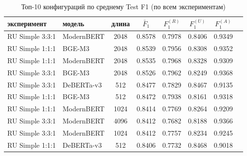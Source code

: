 \begin{table}[H]
\centering
\caption{Топ-10 конфигураций по среднему Test F1 (по всем экспериментам)}
\label{tab:leaderboard_top10}
\small
\setlength{\tabcolsep}{4pt}
\begin{tabular}{llcccccc}
\toprule
эксперимент & модель & длина & $\bar{F}_1$ & $F_1^{(R)}$ & $F_1^{(U)}$ & $F_1^{(A)}$ \\
\midrule
RU Simple 3:3:1 & ModernBERT & 2048 & 0.8578 & 0.7978 & 0.8406 & 0.9349 \\
RU Simple 1:1:1 & BGE-M3     & 2048 & 0.8539 & 0.7956 & 0.8308 & 0.9352 \\
RU Simple 1:1:1 & ModernBERT & 2048 & 0.8535 & 0.7968 & 0.8328 & 0.9309 \\
RU Simple 3:3:1 & BGE-M3     & 2048 & 0.8526 & 0.7962 & 0.8249 & 0.9368 \\
RU Simple 3:3:1 & DeBERTa-v3 & 512  & 0.8477 & 0.7829 & 0.8467 & 0.9135 \\
RU Simple 1:1:1 & BGE-M3     & 512  & 0.8472 & 0.7938 & 0.8161 & 0.9318 \\
RU Simple 1:1:1 & ModernBERT & 1024 & 0.8414 & 0.7769 & 0.8264 & 0.9209 \\
RU Simple 3:3:1 & ModernBERT & 4096 & 0.8412 & 0.7682 & 0.8188 & 0.9366 \\
RU Simple 3:3:1 & ModernBERT & 1024 & 0.8412 & 0.7757 & 0.8234 & 0.9245 \\
RU Simple 1:1:1 & DeBERTa-v3 & 512  & 0.8406 & 0.7732 & 0.8468 & 0.9018 \\
\bottomrule
\end{tabular}
\end{table}
